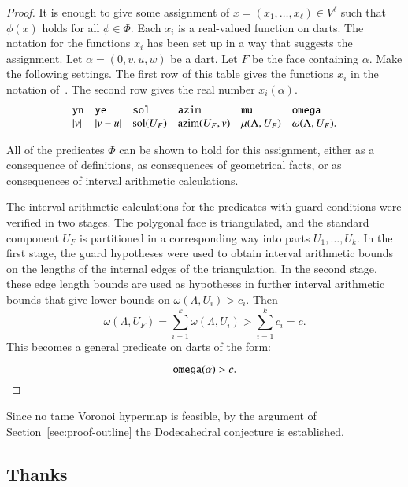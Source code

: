 \documentclass{article} %
\begin{document}
\begin{proof} It is enough to give some assignment of
$x=(x_1,\ldots,x_\ell)\in V^\ell$ 
such that $\phi(x)$ holds for all $\phi\in\Phi$.
Each $x_i$ is a real-valued function on darts.
The notation  for the functions $x_i$ 
has been set up in a way that suggests the assignment.  
Let $\alpha = (0,v,u,w)$ be a dart.  Let $F$ be the face containing $\alpha$. Make the following settings.  The first row of this table gives the functions $x_i$ in the notation of~\cite{McLaughlin:2008:KeplerCode}. The second row gives the real number $x_i(\alpha)$.
$$
\begin{array}{llllllllllll}
{\operatorname{{\texttt{yn}}}} & {\operatorname{{\texttt{ye}}}} & {\operatorname{{\texttt{sol}}}} & {\operatorname{{\texttt{azim}}}} & {\operatorname{{\texttt{mu}}}} & {\operatorname{{\texttt{omega}}}} \\
|v|               & |v-u|           & \operatorname{sol}(U_F)   & {\operatorname{azim}}(U_F,v) & \mu(\Lambda,U_F) & \omega(\Lambda,U_F).\\
\end{array}
$$

All of the predicates $\Phi$ can be shown to hold for this assignment,
either as a consequence of definitions, as consequences of geometrical
facts, or as consequences of interval arithmetic calculations. 

The interval arithmetic calculations for the predicates with guard
conditions were verified in two stages. The polygonal face is
triangulated, and the standard component $U_F$ is partitioned in a
corresponding way into parts $U_1,\ldots,U_k$. In the first stage, the
guard hypotheses were used to obtain interval arithmetic bounds on the
lengths of the internal edges of the triangulation. In the second
stage, these edge length bounds are used as hypotheses in further
interval arithmetic bounds that give lower bounds on
$\omega(\Lambda,U_i) > c_i$. Then
  $$\omega(\Lambda,U_F) = \sum_{i=1}^k\omega(\Lambda,U_i) >\sum_{i=1}^k c_i=c.$$
This becomes a general predicate on darts of the form:

$$
{\operatorname{{\texttt{omega}}}}(\alpha) > c.
$$
\end{proof}

Since no tame Voronoi hypermap is feasible, by the argument of
Section~\ref{sec:proof-outline} the Dodecahedral conjecture is
established.

\subsection*{Thanks}
\end{document}
